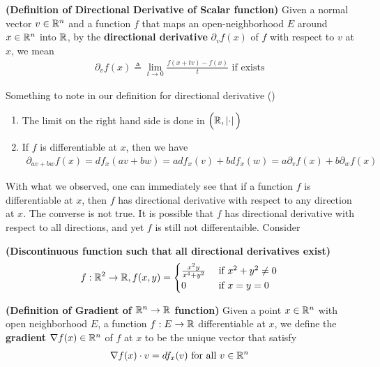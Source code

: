 \documentclass{report}
\begin{document}
\begin{definition}
\label{DoDDoS}
\textbf{(Definition of Directional Derivative of Scalar function)} Given a normal vector $v \in\mathbb{R}^n$ and a function $f$ that maps an open-neighborhood $E$ around  $x \in\mathbb{R}^n$ into $\mathbb{R}$, by the \textbf{directional derivative} $\partial _v f(x)$ of $f$ with respect to $v$ at $x$, we mean
\begin{align*}
\partial_v f(x)\triangleq \lim_{t\to 0} \frac{f(x+tv)-f(x)}{t}\text{ if exists }
\end{align*}
\end{definition}
\begin{mdframed}
Something to note in our definition for directional derivative ()
\begin{enumerate}[label=(\alph*)]
  \item The limit on the right hand side is done in $\Big(\mathbb{R} ,\left|\cdot\right|\Big)$ 
  \item If $f$ is differentiable at $x$, then we have
    \begin{align}
    \label{pavfx}
    \partial_{av+bw} f(x)=df_x(av+bw)=adf_x(v)+bdf_x(w)=a\partial_v f(x)+b\partial_w f(x)
    \end{align}
\end{enumerate}
With what we observed, one can immediately see that if a function $f$ is differentiable at $x$, then $f$ has directional derivative with respect to any direction at $x$. The converse is not true. It is possible that  $f$ has directional derivative with respect to all directions, and yet $f$ is still not differentaible. Consider 
\end{mdframed}
\begin{Example}{\textbf{(Discontinuous function such that all directional derivatives exist)}}{}
\begin{align*}
f:\mathbb{R}^2 \rightarrow \mathbb{R}, f(x,y)=\begin{cases}
 \frac{x^2y}{x^4+y^2} & \text{ if $x^2+y^2\neq 0$ }\\
 0& \text{ if $x=y=0$ }
\end{cases}
\end{align*}
\end{Example}
\begin{definition}
\textbf{(Definition of Gradient of $\mathbb{R}^n\rightarrow \mathbb{R}$ function)} Given a point $x\in\mathbb{R}^n$ with open neighborhood $E$, a function $f:E\rightarrow \mathbb{R}$ differentiable at $x$, we define the \textbf{gradient} $\nabla f(x)\in\mathbb{R}^n$ of $f$ at $x$ to be the unique vector that satisfy
\begin{align*}
\nabla f(x)\cdot v=df_x(v)\text{ for all $v\in\mathbb{R}^n$ }
\end{align*}
\end{definition}
\end{document}
